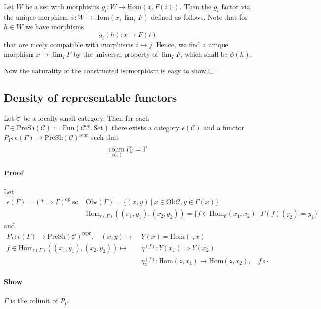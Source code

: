 Let $W$ be a set with morphisms $g_i: W \to \mathrm{Hom}(x, F(i))$. Then the $g_i$ factor via the unique morphism $\phi: W \to \mathrm{Hom}(x, \lim_I F)$ defined as follows.
Note that for $h \in W$ we have morphisms
\begin{equation*}
    g_i(h): x \to F(i)
\end{equation*}
that are nicely compatible with morphisms $i \to j$.
Hence, we find a unique morphism $x \to \lim_I F$ by the universal property of $\lim_I F$, which shall be $\phi(h)$.

Now the naturality of the constructed isomorphism is easy to show.$\hfill\square$

\subsection{Density of representable functors}
Let $\mathcal{C}$ be a locally small category. 
Then for each $\Gamma \in \mathrm{PreSh}(\mathcal{C}) := \mathrm{Fun}(\mathcal{C}^{\mathrm{op}}, \mathrm{Set})$ there exists a category $\epsilon(\mathcal{C})$ and a functor $P_\Gamma: \epsilon(\Gamma) \to \mathrm{PreSh}(\mathcal{C})^{\mathrm{repr}}$ such that
\begin{equation*}
    \operatorname*{colim}_{\epsilon(\Gamma)} P_\Gamma = \Gamma
\end{equation*}
\paragraph{Proof} Let
\begin{align*}
    \epsilon(\Gamma) = (* \Rightarrow \Gamma)^{\mathrm{op}} \ \text{so} \ &\mathrm{Ob}\epsilon(\Gamma) = \{ (x, y) \ | \ x \in \mathrm{Ob}\mathcal{C}, y \in \Gamma(x)\} \\
    &\mathrm{Hom}_{\epsilon(\Gamma)}((x_1, y_1), (x_2, y_2)) = \{ f \in \mathrm{Hom}_{\mathcal{C}}(x_1, x_2) \ | \ \Gamma(f)(y_2) = y_1 \}
\end{align*}
and
\begin{align*}
    P_\Gamma: \epsilon(\Gamma) \to \mathrm{PreSh}(\mathcal{C})^{\mathrm{repr}}, \quad (x, y) \mapsto \ &Y(x) = \mathrm{Hom}(\cdot, x) \\
    f \in \mathrm{Hom}_{\epsilon(\Gamma)}((x_1, y_1), (x_2, y_2)) \mapsto \ &\eta^{(f)}: Y(x_1) \Rightarrow Y(x_2) \\
    &\eta^{(f)}_z: \mathrm{Hom}(z, x_1) \to \mathrm{Hom}(z, x_2), \quad f \circ \cdot
\end{align*}
\paragraph{Show} $\Gamma$ is the colimit of $P_\Gamma$.

